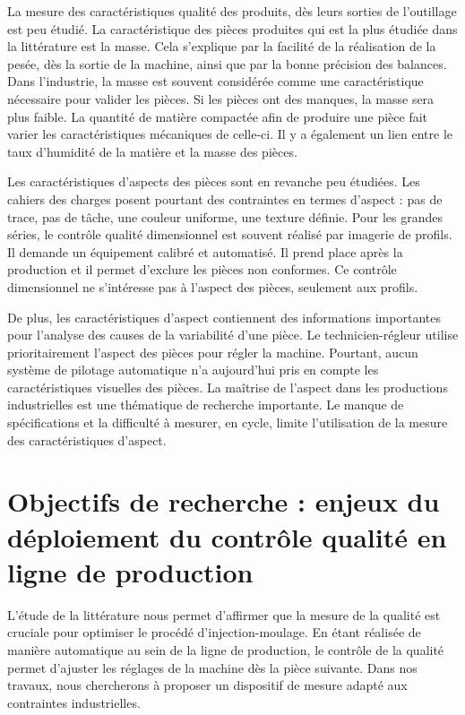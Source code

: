 La mesure des caractéristiques qualité des produits, dès leurs sorties de l'outillage est peu étudié.
La caractéristique des pièces produites qui est la plus étudiée dans la littérature est la masse.
Cela s'explique par la facilité de la réalisation de la pesée, dès la sortie de la machine, ainsi que par la bonne précision des balances.
Dans l'industrie, la masse est souvent considérée comme une caractéristique nécessaire pour valider les pièces.
Si les pièces ont des manques, la masse sera plus faible.
La quantité de matière compactée afin de produire une pièce fait varier les caractéristiques mécaniques de celle-ci.
Il y a également un lien entre le taux d'humidité de la matière et la masse des pièces.

Les caractéristiques d'aspects des pièces sont en revanche peu étudiées.
Les cahiers des charges posent pourtant des contraintes en termes d'aspect : pas de trace, pas de tâche, une couleur uniforme, une texture définie.
Pour les grandes séries, le contrôle qualité dimensionnel est souvent réalisé par imagerie de profils.
Il demande un équipement calibré et automatisé.
Il prend place après la production et il permet d'exclure les pièces non conformes.
Ce contrôle dimensionnel ne s'intéresse pas à l'aspect des pièces, seulement aux profils.

De plus, les caractéristiques d'aspect contiennent des informations importantes pour l'analyse des causes de la variabilité d'une pièce. %
Le technicien-régleur utilise prioritairement l'aspect des pièces pour régler la machine.
Pourtant, aucun système de pilotage automatique n'a aujourd'hui pris en compte les caractéristiques visuelles des pièces.
La maîtrise de l'aspect dans les productions industrielles est une thématique de recherche importante. %
Le manque de spécifications et la difficulté à mesurer, en cycle, limite l'utilisation de la mesure des caractéristiques d'aspect.

\section{Objectifs de recherche : enjeux du déploiement du contrôle qualité en ligne de production} \label{sec:research_objectives}
L'étude de la littérature nous permet d'affirmer que la mesure de la qualité est cruciale pour optimiser le procédé d'injection-moulage.
En étant réalisée de manière automatique au sein de la ligne de production, le contrôle de la qualité permet d'ajuster les réglages de la machine dès la pièce suivante.
Dans nos travaux, nous chercherons à proposer un dispositif de mesure adapté aux contraintes industrielles.

